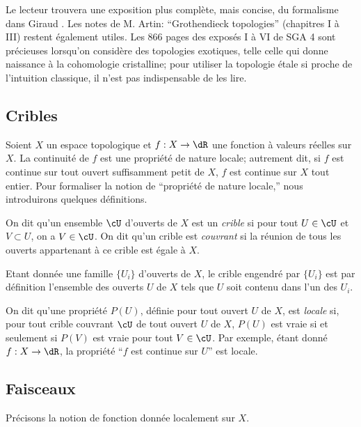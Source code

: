 Le lecteur trouvera une exposition plus complète, mais concise, du 
formalisme dans Giraud \cite{gi64}. Les notes de M. Artin: ``Grothendieck 
topologies'' \cite{ar62} (chapitres I à III) restent également utiles. Les 
866 pages des exposés I à VI de SGA 4 sont précieuses lorsqu'on 
considère des topologies exotiques, telle celle qui donne naissance à la 
cohomologie cristalline; pour utiliser la topologie étale si proche de 
l'intuition classique, il n'est pas indispensable de les lire. 










\subsection{Cribles}\label{I:1-1}

Soient $X$ un espace topologique et $f:X\to \dR$ une fonction à valeurs 
réelles sur $X$. La continuité de $f$ est une propriété de nature 
locale; autrement dit, si $f$ est continue sur tout ouvert suffisamment petit 
de $X$, $f$ est continue sur $X$ tout entier. Pour formaliser la notion de 
``propriété de nature locale,'' nous introduirons quelques définitions.

On dit qu'un ensemble $\cU$ d'ouverts de $X$ est un \emph{crible} si pour tout 
$U\in\cU$ et $V\subset U$, on a $V\in\cU$. On dit qu'un crible est 
\emph{couvrant} si la réunion de tous les ouverts appartenant à ce crible est 
égale à $X$.

Etant donnée une famille $\{U_i\}$ d'ouverts de $X$, le crible engendré par 
$\{U_i\}$ est par définition l'ensemble des ouverts $U$ de $X$ tels que $U$ 
soit contenu dans l'un des $U_i$. 

On dit qu'une propriété $P(U)$, définie pour tout ouvert $U$ de $X$, est 
\emph{locale} si, pour tout crible couvrant $\cU$ de tout ouvert $U$ de $X$, 
$P(U)$ est vraie si et seulement si $P(V)$ est vraie pour tout $V\in \cU$. Par 
exemple, étant donné $f:X\to \dR$, la propriété ``$f$ est continue sur $U$'' 
est locale. 





\subsection{Faisceaux}\label{I:1-2}

Précisons la notion de fonction donnée localement sur $X$.





